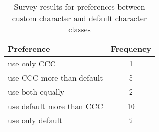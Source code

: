 \begin{table}
\caption{Survey results for preferences between custom character and default character classes \label{tab:cccvsdefault}}
\begin{center}
\begin{small}
\begin{tabular}{l|c}
\toprule
\textbf{Preference} & \textbf{Frequency} \\  \midrule \bigstrut
use only CCC & 1\\ \midrule \bigstrut
use CCC more than default & 5 \\ \midrule \bigstrut
use both equally & 2\\ \midrule \bigstrut
use default more than CCC & 10\\ \midrule \bigstrut
use only default & 2\\
\bottomrule
\end{tabular}
\end{small}
\end{center}
\vspace{-12pt}
\end{table}
